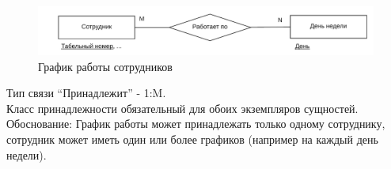 \documentclass[14pt,a4paper,russian]{extreport}
\begin{document}
\begin{figure}[h!]
        \includegraphics[width=\textwidth]{timetable}
        \caption{График работы сотрудников}
        \label{fig:timetable}
\end{figure}

\noindent Тип связи ``Принадлежит'' - 1:M.\\
Класс принадлежности обязательный для обоих экземпляров сущностей.
Обоснование: График работы может принадлежать только одному сотруднику, сотрудник может иметь
один или более графиков (например на каждый день недели).
\end{document}
